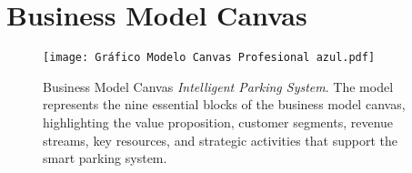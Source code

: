 \section{Business Model Canvas}




\begin{figure}[h!]
    \centering
   
    \texttt{[image: Gráfico Modelo Canvas Profesional azul.pdf]}
    \caption{Business Model Canvas \textit{Intelligent Parking System}. 
    The model represents the nine essential blocks of the business model canvas, highlighting the value proposition, customer segments, revenue streams, key resources, and strategic activities that support the smart parking system.}
    \label{fig:business_model_canvas}
\end{figure}
